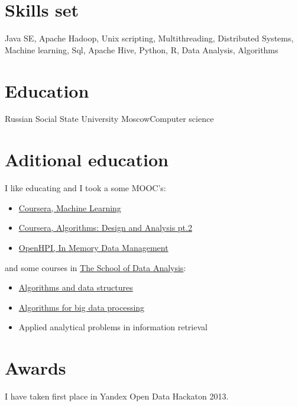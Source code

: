 \documentclass[xetex]{moderncv}
\begin{document}
\section{Skills set}
Java SE, Apache Hadoop, Unix scripting, Multithreading, Distributed Systems, Machine learning, Sql, Apache Hive, Python, R, Data Analysis, Algorithms

\pagebreak

\section{Education}
 {Russian Social State University} {Moscow}{}{Computer science}

\section {Aditional education}

I like educating and I took a some MOOC's:  
\begin{itemize}
\item \href{https://www.dropbox.com/s/ey4kpuspil6ez54/Statement\%20of\%20Accomplishment.pdf}{Coursera, Machine Learning }
\item \href{https://www.dropbox.com/s/ot8hvdck28tyoj4/AlgoDA2.pdf}{Coursera,  Algorithms: Design and Analysis pt.2 }
\item \href{https://www.dropbox.com/s/ikqocsfb94sot51/in_memory_data_management_certificate_full_15656.pdf}{OpenHPI, In Memory Data Management }
\end{itemize}
and some courses in \href{http://shad.yandex.ru/?ncrnd=6964}{The School of Data Analysis}:
\begin{itemize}
\item \href{http://shad.yandex.ru/program/algorithms1.xml}{ Algorithms and data structures}
\item \href{http://shad.yandex.ru/program/algorithms3.xml}{ Algorithms for big data processing}
\item Applied analytical problems in information retrieval
\end{itemize} 
\section {Awards}
I have taken first place in Yandex Open Data Hackaton 2013.
\end{document}
